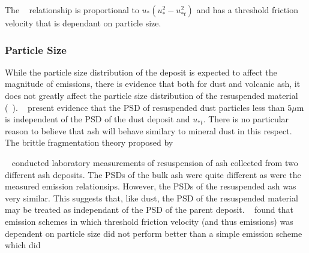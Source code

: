 The ~\cite{Marticorena97} relationship is proportional to $u_*(u_*^2 -u_{*t}^2)$ and has a threshold friction velocity
that is dependant on particle size. 



%


\subsubsection{Particle Size}

While the particle size distribution of the deposit is expected to affect the magnitude of emissions, there is evidence that
both for dust and volcanic ash, it does not greatly affect the particle size distribution of the resuspended material (~\citep{Mahowald14,DRI}).
~\cite{Kok11, Kok11b, Mahowald14} present evidence that the PSD of resuspended dust particles less than $5\mu\mathrm{m}$ is independent of the PSD of the dust deposit and $u_{*t}$.
There is no particular reason to believe that ash will behave similary to mineral dust in this respect. The brittle fragmentation theory proposed by ~\cite{Kok11} 


~\cite{DRI} conducted laboratory measurements of resuspension of ash collected from two different ash deposits. The PSDs of the bulk ash were quite different 
as were the measured emission relationsips. However, the PSDs of the resuspended ash was very similar. This suggests that, like dust, the PSD of the resuspended material may be treated as independant of the PSD of the parent deposit. 
~\cite{Folch14} found that emission schemes in which threshold friction velocity (and thus emissions) was dependent on particle size did not perform better than
a simple emission scheme which did

